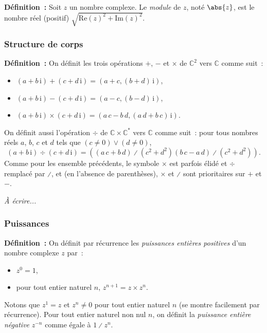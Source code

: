 \noindent\textbf{Définition :}  \sindex[isy]{$\abs{\cdot}$}
    Soit $z$ un nombre complexe. 
    Le \emph{module} de $z$, noté $\abs{z}$, est le nombre réel (positif) $\sqrt{\mathrm{Re}(z)^2 + \mathrm{Im}(z)^2}$.

\subsubsection{Structure de corps}

\noindent\textbf{Définition :} 
    \sindex[isy]{$+$} \sindex[isy]{$-$} \sindex[isy]{$\times$} 
    On définit les trois opérations $+$, $-$ et $\times$ de $\mathbb{C}^2$ vers $\mathbb{C}$ comme suit :
    \begin{itemize}[nosep]
        \item $(a + b \, \mathrm{i}) + (c + d \, \mathrm{i}) = (a + c, (b + d) \, \mathrm{i})$,
        \item $(a + b \, \mathrm{i}) - (c + d \, \mathrm{i}) = (a - c, (b - d) \, \mathrm{i})$,
        \item $(a + b \, \mathrm{i}) \times (c + d \, \mathrm{i}) = (a \, c -  b \, d, (a \, d + b \, c) \, \mathrm{i})$.
    \end{itemize}
    \sindex[isy]{$\div$} \sindex[isy]{$\divslash$}
    On définit aussi l'opération $\div$ de $\mathbb{C} \times \mathbb{C}^*$ vers $\mathbb{C}$ comme suit : pour tous nombres réels $a$, $b$, $c$ et $d$ tels que $(c \neq 0) \vee (d \neq 0)$, 
    \begin{equation*}
        (a + b \, \mathrm{i}) \div (c + d \, \mathrm{i}) = 
        \left( 
            \left( a \, c + b \, d \right) \divslash \left( c^2 + d^2 \right)
            \left( b \, c - a \, d \right) \divslash \left( c^2 + d^2 \right)
        \right) .
    \end{equation*}
    Comme pour les ensemble précédents, le symbole $\times$ est parfois élidé et $\div$ remplacé par $\divslash$, et (en l'absence de parenthèses), $\times$ et $\divslash$ sont prioritaires sur $+$ et $-$.

\medskip

\emph{À écrire...}

\subsubsection{Puissances}

\noindent\textbf{Définition :} On définit par récurrence les \emph{puissances entières positives} d'un nombre complexe $z$ par :
    \begin{itemize}[nosep]
        \item $z^0 = 1$,
        \item pour tout entier naturel $n$, $z^{n+1} = z \times z^n$.
    \end{itemize}
    Notons que $z^1 = z$ et $z^n \neq 0$ pour tout entier naturel $n$ (se montre facilement par récurrence).
    Pour tout entier naturel non nul $n$, on définit la \emph{puissance entière négative} $z^{-n}$ comme égale à $1 \divslash z^n$.

\medskip
